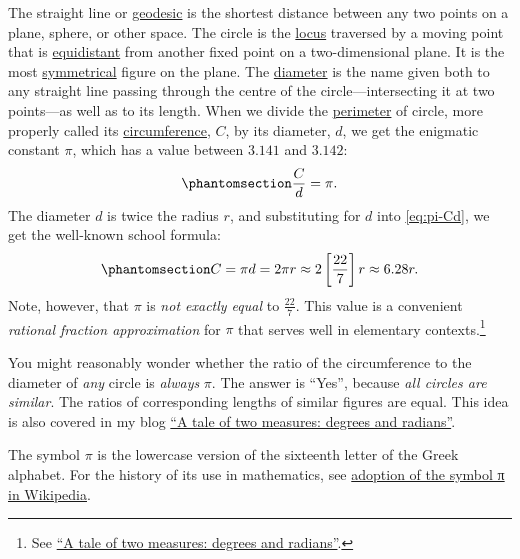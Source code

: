 \documentclass[
  a4paper,
]{article}
\begin{document}
The straight line or
\href{https://mathworld.wolfram.com/Geodesic.html}{geodesic} is the
shortest distance between any two points on a plane, sphere, or other
space. The circle is the
\href{https://en.wikipedia.org/wiki/Locus_(mathematics)}{locus}
traversed by a moving point that is
\href{https://en.wikipedia.org/wiki/Equidistant}{equidistant} from
another fixed point on a two-dimensional plane. It is the most
\href{https://mathworld.wolfram.com/Symmetry.html}{symmetrical} figure
on the plane. The
\href{https://en.wikipedia.org/wiki/Diameter}{diameter} is the name
given both to any straight line passing through the centre of the
circle---intersecting it at two points---as well as to its length. When
we divide the \href{https://en.wikipedia.org/wiki/Perimeter}{perimeter}
of circle, more properly called its
\href{https://en.wikipedia.org/wiki/Circumference}{circumference},
\(C\), by its diameter, \(d\), we get the enigmatic constant \(\pi\),
which has a value between \(3.141\) and \(3.142\):
\begin{equation}\phantomsection\label{eq:pi-Cd}{
\frac{C}{d} = \pi.
}\end{equation} The diameter \(d\) is twice the radius \(r\), and
substituting for \(d\) into \cref{eq:pi-Cd}, we get the well-known
school formula: \begin{equation}\phantomsection\label{eq:two-pi-r}{
C = \pi d = 2\pi r \approx 2\left[\frac{22}{7}\right]r \approx 6.28r.
}\end{equation} Note, however, that \(\pi\) is \emph{not exactly equal}
to \(\frac{22}{7}\). This value is a convenient \emph{rational fraction
approximation} for \(\pi\) that serves well in elementary
contexts.\footnote{See
  \href{https://swanlotus.netlify.app/blogs/a-tale-of-two-measures-degrees-and-radians}{``A
  tale of two measures: degrees and radians''}.}

You might reasonably wonder whether the ratio of the circumference to
the diameter of \emph{any} circle is \emph{always} \(\pi\). The answer
is ``Yes'', because \emph{all circles are similar}. The ratios of
corresponding lengths of similar figures are equal. This idea is also
covered in my blog
\href{https://swanlotus.netlify.app/blogs/a-tale-of-two-measures-degrees-and-radians}{``A
tale of two measures: degrees and radians''}.

The symbol \href{https://en.wikipedia.org/wiki/Pi}{\(\pi\)} is the
lowercase version of the sixteenth letter of the Greek alphabet. For the
history of its use in mathematics, see
\href{https://en.wikipedia.org/wiki/Pi\#Adoption_of_the_symbol_\%CF\%80}{adoption
of the symbol π in Wikipedia}.
\end{document}
